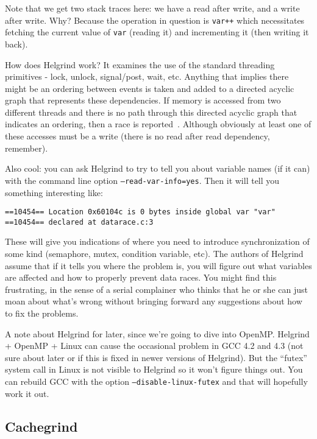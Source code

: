 Note that we get two stack traces here: we have a read after write, and a write after write. Why? Because the operation in question is \texttt{var++} which necessitates fetching the current value of \texttt{var} (reading it) and incrementing it (then writing it back).

How does Helgrind work? It examines the use of the standard threading primitives - lock, unlock, signal/post, wait, etc. Anything that implies there might be an ordering between events is taken and added to a directed acyclic graph that represents these dependencies. If memory is accessed from two different threads and there is no path through this directed acyclic graph that indicates an ordering, then a race is reported~\cite{helgrind}. Although obviously at least one of these accesses must be a write (there is no read after read dependency, remember).

Also cool: you can ask Helgrind to try to tell you about variable names (if it can) with the command line option \texttt{--read-var-info=yes}. Then it will tell you something interesting like:

\begin{verbatim}
==10454== Location 0x60104c is 0 bytes inside global var "var"
==10454== declared at datarace.c:3
\end{verbatim}

These will give you indications of where you need to introduce synchronization of some kind (semaphore, mutex, condition variable, etc). The authors of Helgrind assume that if it tells you where the problem is, you will figure out what variables are affected and how to properly prevent data races. You might find this frustrating, in the sense of a serial complainer who thinks that he or she can just moan about what's wrong without bringing forward any suggestions about how to fix the problems. 

A note about Helgrind for later, since we're going to dive into OpenMP. Helgrind + OpenMP + Linux can cause the occasional problem in GCC 4.2 and 4.3 (not sure about later or if this is fixed in newer versions of Helgrind). But the ``futex'' system call in Linux is not visible to Helgrind so it won't figure things out. You can rebuild GCC with the option \texttt{--disable-linux-futex} and that will hopefully work it out.

\subsection*{Cachegrind}

